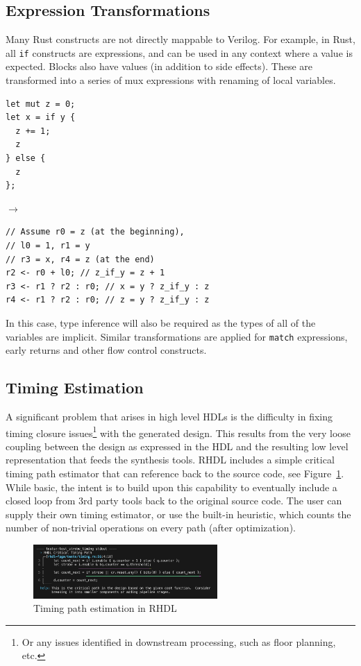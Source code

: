 \documentclass[sigplan,screen,sigconf]{acmart}
\begin{document}
\subsection{Expression Transformations}
Many Rust constructs are not directly mappable to Verilog.  For example, in Rust, all \verb|if| constructs are expressions, and can be used in any context where a value is expected.  Blocks also have values (in addition to side effects).  These are transformed into a series of mux expressions with renaming of local variables.
\begin{center}
  \begin{minipage}{0.25\linewidth}
    \begin{verbatim}
let mut z = 0;
let x = if y {
  z += 1;
  z
} else {
  z
};
    \end{verbatim}
  \end{minipage}
    $\rightarrow$
    \begin{minipage}{0.57\linewidth}
\begin{verbatim}
// Assume r0 = z (at the beginning), 
// l0 = 1, r1 = y
// r3 = x, r4 = z (at the end)
r2 <- r0 + l0; // z_if_y = z + 1
r3 <- r1 ? r2 : r0; // x = y ? z_if_y : z
r4 <- r1 ? r2 : r0; // z = y ? z_if_y : z
\end{verbatim}
\end{minipage}
\end{center}
In this case, type inference will also be required as the types of all of the variables are implicit.  Similar transformations are applied for \verb|match| expressions, early returns and other flow control constructs.  

\subsection{Timing Estimation}
A significant problem that arises in high level HDLs is the difficulty in fixing timing closure issues\footnote{Or any issues identified in downstream processing, such as floor planning, etc.} with the generated design.  This results from the very loose coupling between the design as expressed in the HDL and the resulting low level representation that feeds the synthesis tools.  RHDL includes a simple critical timing path estimator that can reference back to the source code, see Figure~\ref{fig:timing}.
While basic, the intent is to build upon this capability to eventually include a closed loop from 3rd party tools back to the original source code.  The user can supply their own timing estimator, or use the built-in heuristic, which counts the number of non-trivial operations on every path (after optimization).
\begin{figure}[!h]
  \centering
  \includegraphics[width=7.0cm]{timing.png}
  \caption{Timing path estimation in RHDL \label{fig:timing}}
\end{figure}
\end{document}

